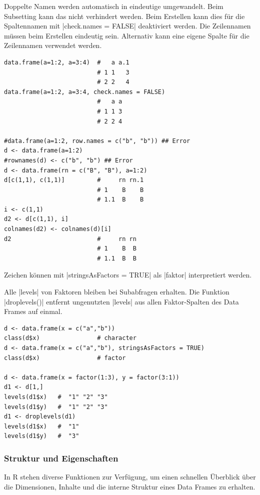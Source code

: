 \documentclass[10pt,twocolumn]{scrartcl}
\renewcommand{\lstinline}{\mycoloredinline}
\begin{document}
Doppelte Namen werden automatisch in eindeutige umgewandelt. Beim Subsetting kann das nicht verhindert werden. Beim Erstellen kann dies für die Spaltennamen mit \lstinline|check.names = FALSE| deaktiviert werden. Die Zeilennamen müssen beim Erstellen eindeutig sein. Alternativ kann eine eigene Spalte für die Zeilennamen verwendet werden.

\begin{lstlisting}
data.frame(a=1:2, a=3:4)  #   a a.1
                          # 1 1   3
                          # 2 2   4
data.frame(a=1:2, a=3:4, check.names = FALSE)
                          #   a a
                          # 1 1 3
                          # 2 2 4

#data.frame(a=1:2, row.names = c("b", "b")) ## Error
d <- data.frame(a=1:2)
#rownames(d) <- c("b", "b") ## Error
d <- data.frame(rn = c("B", "B"), a=1:2)
d[c(1,1), c(1,1)]         #     rn rn.1
                          # 1    B    B
                          # 1.1  B    B
i <- c(1,1)
d2 <- d[c(1,1), i]
colnames(d2) <- colnames(d)[i]
d2                        #     rn rn
                          # 1    B  B
                          # 1.1  B  B
\end{lstlisting}

Zeichen können mit \lstinline|stringsAsFactors = TRUE| als \lstinline|faktor| interpretiert werden.

Alle \lstinline|levels| von Faktoren bleiben bei Subabfragen erhalten. Die Funktion \lstinline|droplevels()| entfernt ungenutzten \lstinline|levels| aus allen Faktor-Spalten des Data Frames auf einmal.

\begin{lstlisting}
d <- data.frame(x = c("a","b"))
class(d$x)                # character
d <- data.frame(x = c("a","b"), stringsAsFactors = TRUE)
class(d$x)                # factor

d <- data.frame(x = factor(1:3), y = factor(3:1))
d1 <- d[1,]
levels(d1$x)   #  "1" "2" "3"
levels(d1$y)   #  "1" "2" "3"
d1 <- droplevels(d1)
levels(d1$x)   #  "1"
levels(d1$y)   #  "3"
\end{lstlisting}


\subsubsection{Struktur und Eigenschaften}

In R stehen diverse Funktionen zur Verfügung, um einen schnellen Überblick über die Dimensionen, Inhalte und die interne Struktur eines Data Frames zu erhalten.
\end{document}
